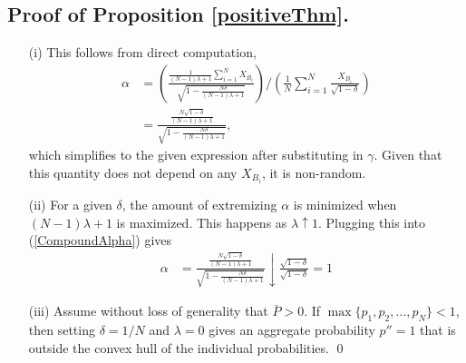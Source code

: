 \documentclass[12pt]{article}
\theoremstyle{definition}
\theoremstyle{definition}
\begin{document}
\subsection{Proof of Proposition \ref{positiveThm}.}

\begin{enumerate}
\item[(i)] This follows from direct computation,
\begin{align}
\alpha &= \left( \frac{\frac{1}{(N-1)\lambda +1} 
  \sum_{i=1}^N X_{B_i} }{\sqrt{1- \frac{N\delta}{(N-1)\lambda +1} }} \right) \Big/ \left( \frac{1}{N} \sum_{i=1}^N \frac{X_{B_i}}{\sqrt{1-\delta}} \right) \nonumber \\
&=    \frac{\frac{N\sqrt{1-\delta}}{(N-1)\lambda +1} 
   }{\sqrt{1- \frac{N\delta}{(N-1)\lambda +1} }}, \label{CompoundAlpha}
\end{align}
which simplifies to the given expression after substituting in $\gamma$. Given that this quantity does not depend on any $X_{B_i}$, it is non-random.

\item[(ii)] For a given $\delta$, the amount of extremizing $\alpha$ is minimized when $(N-1)\lambda +1$ is maximized. This happens as $\lambda \uparrow 1$. Plugging this into (\ref{CompoundAlpha}) gives
\begin{align*}
\alpha &= \frac{\frac{N\sqrt{1-\delta}}{(N-1)\lambda +1}}{\sqrt{1- \frac{N\delta}{(N-1)\lambda +1} }}  \downarrow \frac{\sqrt{1-\delta}}{\sqrt{1-\delta }} = 1
\end{align*}
\item[(iii)] Assume without loss of generality that $\bar{P} > 0$. If $\max\{p_1, p_2, \dots, p_N \} < 1$, then  setting $\delta = 1/N$ and $\lambda = 0$ gives an aggregate probability $p'' = 1$ that is outside the convex hull of the individual probabilities.
\qed
\end{enumerate}
\end{document}
